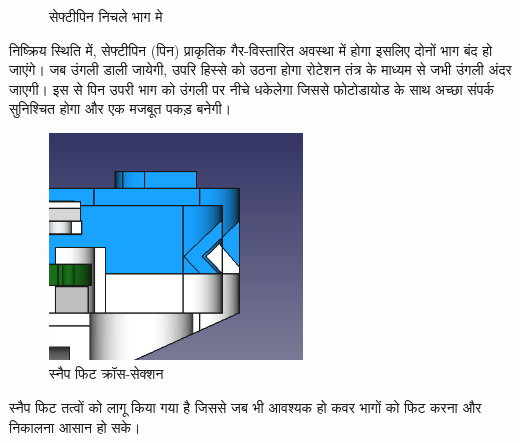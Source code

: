 		\begin{figure}[ht!]
			\centering
			\hfill
			\caption{सेफ्टीपिन निचले भाग मे}
		\end{figure}	
		
		निष्क्रिय स्थिति में, सेफ्टीपिन (पिन) प्राकृतिक गैर-विस्तारित अवस्था में होगा इसलिए दोनों  भाग बंद हो जाएंगे। जब उंगली डाली जायेगी, उपरि हिस्से को उठना होगा रोटेशन तंत्र के माध्यम से जभी उंगली अंदर जाएगी। इस से पिन उपरी भाग को उंगली पर नीचे धकेलेगा जिससे फोटोडायोड के साथ अच्छा संपर्क सुनिश्चित होगा और एक मजबूत पकड़ बनेगी। 

		\begin{figure}[ht!]
			\centering
			\includegraphics[width=0.6\textwidth]{../common/enc/snap.png}
			\caption{स्नैप फिट क्रॉस-सेक्शन}
		\end{figure}	
		
	
		स्नैप फिट तत्वों को लागू किया गया है जिससे जब भी आवश्यक हो कवर भागों को फिट करना और निकालना आसान हो सके। 